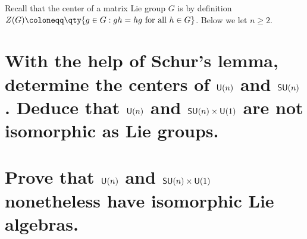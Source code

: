 \documentclass[
	pages,
	boxes,
	color=WildStrawberry
]{homework}
\theoremstyle{plain}
\begin{document}
\begin{problem}
Recall that the center of a matrix Lie group $G$ is by definition $Z(G)\defeq \qty{g\in G : gh = hg \text{ for all } h\in G}$. Below we let $n\geq 2$.
\begin{parts}
	\part{With the help of Schur's lemma, determine the centers of $\mathsf{U}(n)$ and $\mathsf{SU}(n)$. Deduce that $\mathsf{U}(n)$ and $\mathsf{SU}(n)\times\mathsf{U}(1)$ are not isomorphic as Lie groups.}\label{part:1a}
	\part{Prove that $\mathsf{U}(n)$ and $\mathsf{SU}(n)\times\mathsf{U}(1)$ nonetheless have isomorphic Lie algebras.}\label{part:1b}
\end{parts}
\end{problem}
\end{document}
